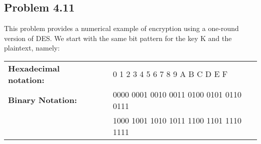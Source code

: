 \documentclass[../hw_sols.tex]{subfiles}
\begin{document}
\newpage



\subsection*{Problem 4.11}

This problem provides a numerical example of encryption using a one-round 
version of DES. We start with the same bit pattern for the key K and the 
plaintext, namely:

\begin{center}
\begin{tabular} { l c l }
	\textbf{Hexadecimal notation:} & \qquad & 0 1 2 3 4 5 6 7 8 9 A B C D E F \\
	\textbf{Binary Notation:} & \qquad & 0000 0001 0010 0011 0100 0101 0110 0111 \\
	& \qquad & 1000 1001 1010 1011 1100 1101 1110 1111
\end{tabular}
\end{center}
\end{document}

